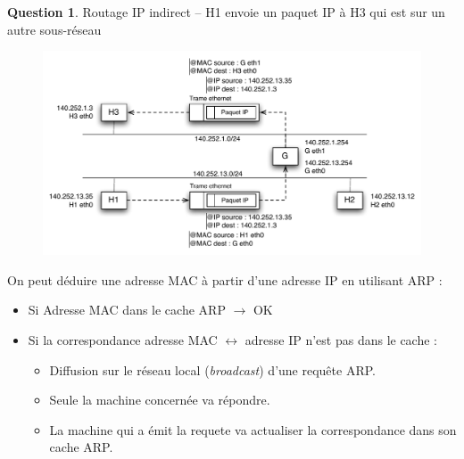 \documentclass[11pt,english,french]{scrreprt}
\theoremstyle{remark}
\theoremstyle{definition}
\newtheorem{ques*}{Question}[subsection]
\begin{document}
\begin{ques*}
	Routage IP indirect -- H1 envoie un paquet IP à H3 qui est sur un autre sous-réseau
	\begin{figure}[h!]
		\center
		\includegraphics[scale=.8]{graphes/Routage-IP-indirect}
	\end{figure}
	
On peut déduire une adresse MAC à partir d'une adresse IP en utilisant ARP : 
\begin{itemize}
	\item Si Adresse MAC dans le cache ARP $\rightarrow$ OK
	\item Si la correspondance adresse MAC $\leftrightarrow$ adresse IP n'est pas dans le cache :\begin{itemize}
		\item Diffusion sur le réseau local (\emph{broadcast}) d'une requête ARP.
		\item Seule la machine concernée va répondre.
		\item La machine qui a émit la requete va actualiser la correspondance dans son cache ARP.
	\end{itemize}
\end{itemize}
\end{ques*}

\vspace{30pt}
\end{document}
